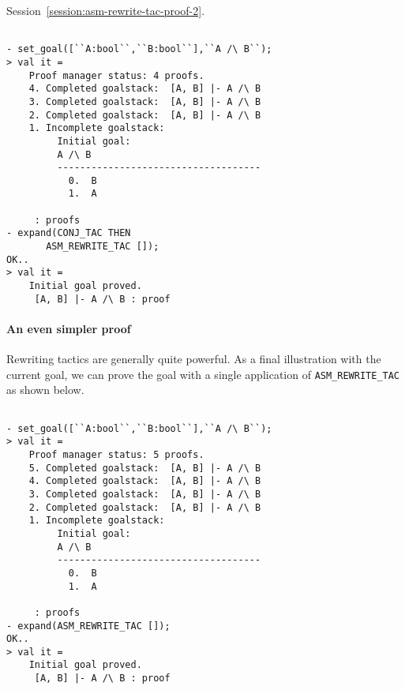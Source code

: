 Session~\ref{session:asm-rewrite-tac-proof-2}. \begin{session}
  \label{session:asm-rewrite-tac-proof-2}
  \begin{scriptsize}
\begin{verbatim}

- set_goal([``A:bool``,``B:bool``],``A /\ B``);
> val it =
    Proof manager status: 4 proofs.
    4. Completed goalstack:  [A, B] |- A /\ B
    3. Completed goalstack:  [A, B] |- A /\ B
    2. Completed goalstack:  [A, B] |- A /\ B
    1. Incomplete goalstack:
         Initial goal:
         A /\ B
         ------------------------------------
           0.  B
           1.  A
         
     : proofs
- expand(CONJ_TAC THEN
       ASM_REWRITE_TAC []);
OK..
> val it =
    Initial goal proved.
     [A, B] |- A /\ B : proof
\end{verbatim}
  \end{scriptsize}
\end{session}

\paragraph*{An even simpler proof}
\label{sec:an-even-simpler}

Rewriting tactics are generally quite powerful. As a final
illustration with the current goal, we can prove the goal with a
single application of \verb|ASM_REWRITE_TAC| as shown below.
\begin{session}
  \label{session:asm-rewrite-tac-proof-3}
  \begin{scriptsize}
\begin{verbatim}

- set_goal([``A:bool``,``B:bool``],``A /\ B``);
> val it =
    Proof manager status: 5 proofs.
    5. Completed goalstack:  [A, B] |- A /\ B
    4. Completed goalstack:  [A, B] |- A /\ B
    3. Completed goalstack:  [A, B] |- A /\ B
    2. Completed goalstack:  [A, B] |- A /\ B
    1. Incomplete goalstack:
         Initial goal:
         A /\ B
         ------------------------------------
           0.  B
           1.  A
         
     : proofs
- expand(ASM_REWRITE_TAC []);
OK..
> val it =
    Initial goal proved.
     [A, B] |- A /\ B : proof
\end{verbatim}
  \end{scriptsize}

\end{session}

